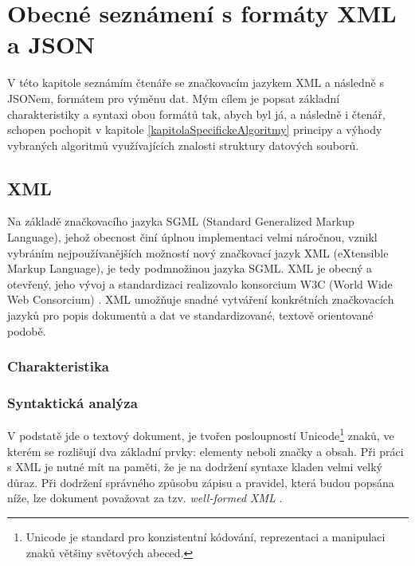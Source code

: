 \chapter{Obecné seznámení s formáty XML a JSON}
V této kapitole seznámím čtenáře se značkovacím jazykem XML a následně s JSONem, formátem pro výměnu dat. Mým cílem je popsat základní charakteristiky a syntaxi obou formátů tak, abych byl já, a následně i čtenář, schopen pochopit v kapitole \ref{kapitolaSpecifickeAlgoritmy} principy a výhody vybraných algoritmů využívajících znalosti struktury datových souborů.

\section{XML}
Na základě značkovacího jazyka SGML (Standard Generalized Markup Language), jehož obecnost činí úplnou implementaci velmi náročnou, vznikl vybráním nejpoužívanějších možností nový značkovací jazyk XML (eXtensible Markup Language), je tedy podmnožinou jazyka SGML. XML je obecný a otevřený, jeho vývoj a standardizaci realizovalo konsorcium W3C (World Wide Web Consorcium) \cite{w3cxml}. XML umožňuje snadné vytváření konkrétních značkovacích jazyků pro popis dokumentů a dat ve standardizované, textově orientované podobě. 

\subsection{Charakteristika}


\subsection{Syntaktická analýza}
V podstatě jde o textový dokument, je tvořen posloupností Unicode\footnote{Unicode je standard pro konzistentní kódování, reprezentaci a manipulaci znaků většiny světových abeced.} znaků, ve kterém se rozlišují dva základní prvky: elementy neboli značky a obsah. Při práci s XML je nutné mít na paměti, že je na dodržení syntaxe kladen velmi velký důraz. Při dodržení správného způsobu zápisu a pravidel, která budou popsána níže, lze dokument považovat za tzv. \textit{well-formed XML} \cite{w3cxml}.

